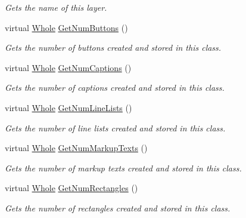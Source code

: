 \begin{DoxyCompactItemize}
\begin{DoxyCompactList}\small\item\em Gets the name of this layer. \item\end{DoxyCompactList}\item 
virtual \hyperlink{namespacephys_a460f6bc24c8dd347b05e0366ae34f34a}{Whole} \hyperlink{classphys_1_1UI_1_1Layer_acebe9d678fe60e02fa4d37647bb9780c}{GetNumButtons} ()
\begin{DoxyCompactList}\small\item\em Gets the number of buttons created and stored in this class. \item\end{DoxyCompactList}\item 
virtual \hyperlink{namespacephys_a460f6bc24c8dd347b05e0366ae34f34a}{Whole} \hyperlink{classphys_1_1UI_1_1Layer_a0e8df4319db95b3573c53b041686e66b}{GetNumCaptions} ()
\begin{DoxyCompactList}\small\item\em Gets the number of captions created and stored in this class. \item\end{DoxyCompactList}\item 
virtual \hyperlink{namespacephys_a460f6bc24c8dd347b05e0366ae34f34a}{Whole} \hyperlink{classphys_1_1UI_1_1Layer_aa25225bb0011d26038959420153d9714}{GetNumLineLists} ()
\begin{DoxyCompactList}\small\item\em Gets the number of line lists created and stored in this class. \item\end{DoxyCompactList}\item 
virtual \hyperlink{namespacephys_a460f6bc24c8dd347b05e0366ae34f34a}{Whole} \hyperlink{classphys_1_1UI_1_1Layer_acc0fbbeabb701ad86826312b2ce88d60}{GetNumMarkupTexts} ()
\begin{DoxyCompactList}\small\item\em Gets the number of markup texts created and stored in this class. \item\end{DoxyCompactList}\item 
virtual \hyperlink{namespacephys_a460f6bc24c8dd347b05e0366ae34f34a}{Whole} \hyperlink{classphys_1_1UI_1_1Layer_a1a006c096c7eb87669f00cb6a385567e}{GetNumRectangles} ()
\begin{DoxyCompactList}\small\item\em Gets the number of rectangles created and stored in this class. \item\end{DoxyCompactList}\item 

\end{DoxyCompactItemize}
